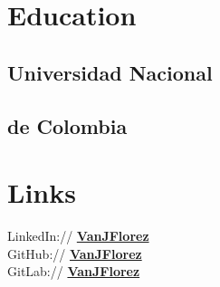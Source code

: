 \documentclass[]{CV-JuanCamiloFlorez}
\begin{document}
%
%
\lastupdated

%
%

%
%
\begin{minipage}[t]{0.33\textwidth} 

\section{Education} 
\subsection{Universidad Nacional}
\subsection{de Colombia}
\sectionsep

\section{Links}
    LinkedIn:// \href{https://www.linkedin.com/in/vanjflores/}{\bf VanJFlorez} \\
    GitHub:// \href{https://github.com/jcammmmm}{\bf VanJFlorez} \\
    GitLab:// \href{https://gitlab.com/VanJFlorez}{\bf VanJFlorez} \\
\sectionsep


\end{minipage}
\end{document}
